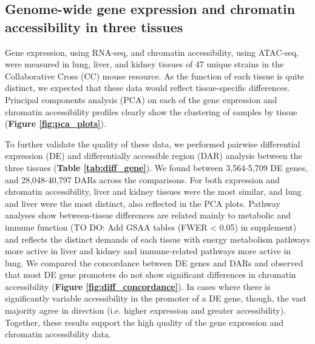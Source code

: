 \subsection{Genome-wide gene expression and chromatin accessibility in three tissues}

Gene expression, using RNA-seq, and chromatin accessibility, using ATAC-seq, were measured in lung, liver, and kidney tissues of 47 unique strains in the Collaborative Cross (CC) mouse resource. As the function of each tissue is quite distinct, we expected that these data would reflect tissue-specific differences. Principal components analysis (PCA) on each of the gene expression and chromatin accessibility profiles clearly show the clustering of samples by tissue (\textbf{Figure \ref{fig:pca_plots}}). 

To further validate the quality of these data, we performed pairwise differential expression (DE) and differentially accessible region (DAR) analysis between the three tissues (\textbf{Table \ref{tab:diff_gene}}). We found between 3,564-5,709 DE genes, and 28,048-40,797 DARs across the comparisons. For both expression and chromatin accessibility, liver and kidney tissues were the most similar, and lung and liver were the most distinct, also reflected in the PCA plots. Pathway analyses show between-tissue differences are related mainly to metabolic and immune function (TO DO: Add GSAA tables (FWER < 0.05) in supplement) and reflects the distinct demands of each tissue with energy metabolism pathways more active in liver and kidney and immune-related pathways more active in lung. We compared the concordance between DE genes and DARs and observed that most DE gene promoters do not show significant differences in chromatin accessibility (\textbf{Figure \ref{fig:diff_concordance}}). In cases where there is significantly variable accessibility in the promoter of a DE gene, though, the vast majority agree in direction (i.e. higher expression and greater accessibility). Together, these results support the high quality of the gene expression and chromatin accessibility data.

